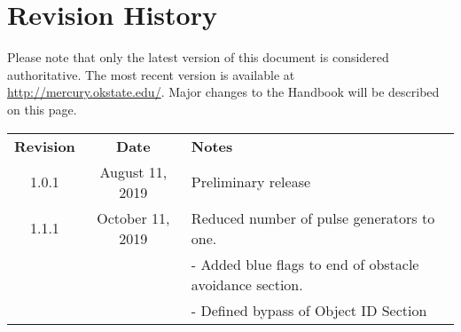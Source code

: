 \section*{Revision History}
Please note that only the latest version of this document is considered authoritative. The most recent version is available at \url{http://mercury.okstate.edu/}. Major changes to the Handbook will be described on this page.

\begin{tabular}{ccl}
\textbf{Revision}	&	\textbf{Date}				&	\textbf{Notes} \\
1.0.1					&	 	August 11, 2019					&	Preliminary release \\
1.1.1					&		October 11, 2019					&	Reduced number of pulse generators to one. \\
					&										&       - Added blue flags to end of obstacle avoidance section.	\\
					&										& 	- Defined bypass of Object ID Section \\
\end{tabular}